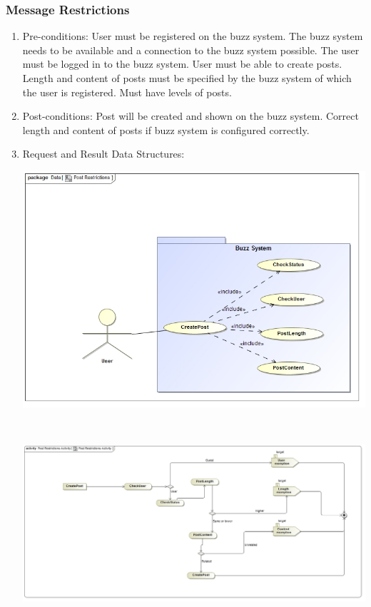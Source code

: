 \documentclass[hidelinks, 12pt, oneside]{article}
\begin{document}
\subsubsection{Message Restrictions}
\begin{enumerate}
 \item Pre-conditions:  User must be registered on the buzz system. The buzz system needs to be available and a connection to the buzz system possible. The user must be logged in to the buzz system. User must be able to create posts. Length and content of posts must be specified by the buzz system of which the user is registered. Must have levels of posts.
 
 \item Post-conditions: Post will be created and shown on the buzz system. Correct length and content of posts if buzz system is configured correctly.

 \item Request and Result Data Structures:\\
  \centerline{\includegraphics[scale=0.4]{PostRestrictions}}\\
 \centerline{\includegraphics[scale=0.35]{PostRestrictionsActivity}} 
\end{enumerate}
\end{document}
